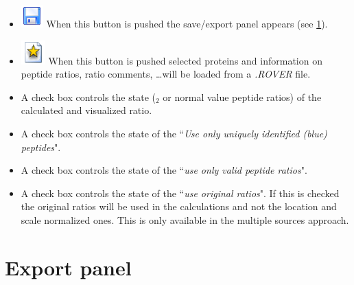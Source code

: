 \documentclass[11pt,a4paper,oneside,notitlepage]{book}
\begin{document}
\begin{itemize}
\item \includegraphics[scale=0.6, H]{filesave.png} When this button is pushed the save/export panel appears (see \ref{save panel}).
\item \includegraphics[scale=0.6, H]{rover.png} When this button is pushed selected proteins and information on peptide ratios, ratio comments, \ldots will be loaded from a \textit{.ROVER} file.
\item A check box controls the state (\log$_{2}$ or normal value peptide ratios) of the calculated and visualized ratio.  
\item A check box controls the state of the ``\textit{Use only uniquely identified (blue) peptides}".
\item A check box controls the state of the ``\textit{use only valid peptide ratios}".
\item A check box controls the state of the ``\textit{use original ratios}". If this is checked the original ratios will be used in the calculations and not the location and scale normalized ones. This is only available in the multiple sources approach.
\end{itemize}

\section{Export panel}\label{save panel}
\end{document}

